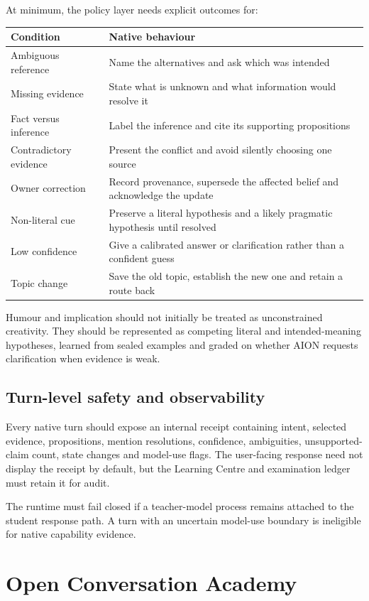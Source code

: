 \documentclass[11pt,a4paper]{article}
\begin{document}
At minimum, the policy layer needs explicit outcomes for:

\begin{longtable}{p{}p{}}
\toprule
Condition & Native behaviour \\
\midrule
Ambiguous reference & Name the alternatives and ask which was intended \\
Missing evidence & State what is unknown and what information would resolve it \\
Fact versus inference & Label the inference and cite its supporting propositions \\
Contradictory evidence & Present the conflict and avoid silently choosing one source \\
Owner correction & Record provenance, supersede the affected belief and acknowledge the update \\
Non-literal cue & Preserve a literal hypothesis and a likely pragmatic hypothesis until resolved \\
Low confidence & Give a calibrated answer or clarification rather than a confident guess \\
Topic change & Save the old topic, establish the new one and retain a route back \\
\bottomrule
\end{longtable}

Humour and implication should not initially be treated as unconstrained creativity.  They should
be represented as competing literal and intended-meaning hypotheses, learned from sealed examples
and graded on whether AION requests clarification when evidence is weak.

\subsection{Turn-level safety and observability}

Every native turn should expose an internal receipt containing intent, selected evidence,
propositions, mention resolutions, confidence, ambiguities, unsupported-claim count, state changes
and model-use flags.  The user-facing response need not display the receipt by default, but the
Learning Centre and examination ledger must retain it for audit.

The runtime must fail closed if a teacher-model process remains attached to the student response
path.  A turn with an uncertain model-use boundary is ineligible for native capability evidence.

\section{Open Conversation Academy}
\end{document}
